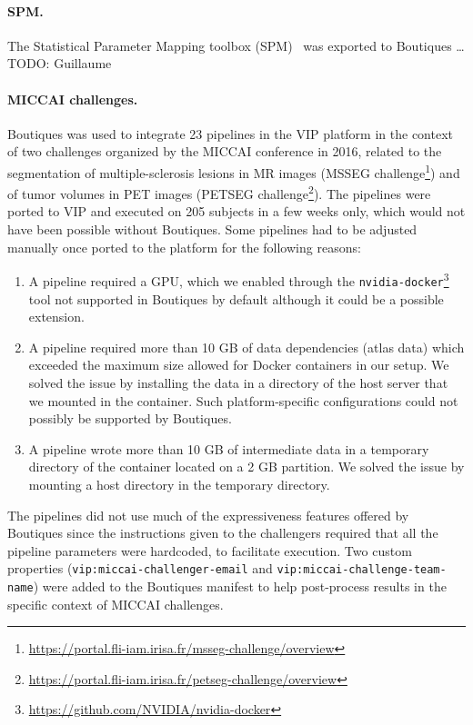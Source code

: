 \documentclass{article}
\newcommand{\todo}[1]{\color{red}TODO: #1\color{black}}
\newcommand{\boutiques}{Boutiques\xspace}
\begin{document}
\paragraph{SPM.} The Statistical Parameter Mapping toolbox (SPM)~\cite{penny2011statistical}
was exported to Boutiques \ldots \todo{Guillaume}

\paragraph{MICCAI challenges.}
\boutiques was used to integrate 23 pipelines in the VIP platform in
the context of two challenges organized by the MICCAI conference in
2016, related to the segmentation of multiple-sclerosis lesions in MR
images (MSSEG
challenge\footnote{\url{https://portal.fli-iam.irisa.fr/msseg-challenge/overview}})
and of tumor volumes in PET images (PETSEG
challenge\footnote{\url{https://portal.fli-iam.irisa.fr/petseg-challenge/overview}}). The
pipelines were ported to VIP and executed on 205 subjects in a few
weeks only, which would not have been possible without
\boutiques. Some pipelines had to be adjusted manually once ported to
the platform for the following reasons:
\begin{enumerate}
\item A pipeline
  required a GPU, which we enabled through the
  \texttt{nvidia-docker}\footnote{\url{https://github.com/NVIDIA/nvidia-docker}}
  tool not supported in Boutiques by default although it could be a possible extension.
\item A pipeline required more than 10 GB of data dependencies (atlas
  data) which exceeded the maximum size allowed for Docker containers
  in our setup. We solved the issue by installing the data in a
  directory of the host server that we mounted in the container. Such
  platform-specific configurations could not possibly be supported by
  \boutiques.
\item A pipeline wrote more than 10 GB of intermediate data in a
  temporary directory of the container located on a 2 GB partition. We
  solved the issue by mounting a host directory in the temporary directory.
\end{enumerate}
The pipelines did not use much of the expressiveness features offered
by \boutiques since the instructions given to the challengers required
that all the pipeline parameters were hardcoded, to facilitate
execution. Two custom properties (\texttt{vip:miccai-challenger-email}
and \texttt{vip:miccai-challenge-team-name}) were added to the
\boutiques manifest to help post-process results in the specific
context of MICCAI challenges.
\end{document}
